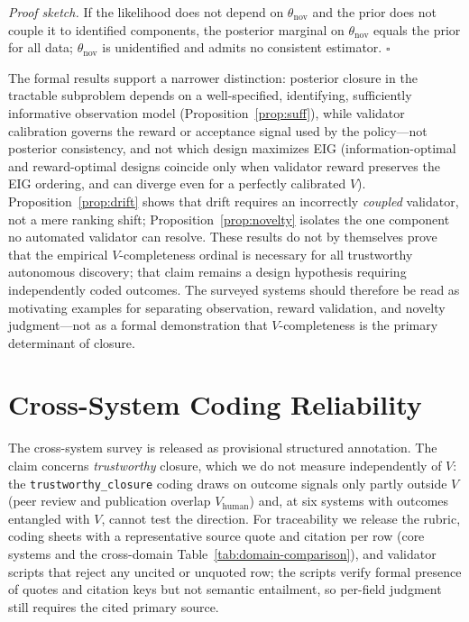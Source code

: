 \documentclass{article}
\begin{document}
\noindent\emph{Proof sketch.} If the likelihood does not depend on $\theta_{\mathrm{nov}}$ and the prior does not couple it to identified components, the posterior marginal on $\theta_{\mathrm{nov}}$ equals the prior for all data; $\theta_{\mathrm{nov}}$ is unidentified and admits no consistent estimator. $\square$

The formal results support a narrower distinction: posterior closure in the tractable subproblem depends on a well-specified, identifying, sufficiently informative observation model (Proposition~\ref{prop:suff}), while validator calibration governs the reward or acceptance signal used by the policy---not posterior consistency, and not which design maximizes EIG (information-optimal and reward-optimal designs coincide only when validator reward preserves the EIG ordering, and can diverge even for a perfectly calibrated $V$). Proposition~\ref{prop:drift} shows that drift requires an incorrectly \emph{coupled} validator, not a mere ranking shift; Proposition~\ref{prop:novelty} isolates the one component no automated validator can resolve. These results do not by themselves prove that the empirical $V$-completeness ordinal is necessary for all trustworthy autonomous discovery; that claim remains a design hypothesis requiring independently coded outcomes. The surveyed systems should therefore be read as motivating examples for separating observation, reward validation, and novelty judgment---not as a formal demonstration that $V$-completeness is the primary determinant of closure.

\section{Cross-System Coding Reliability}
\label{app:coding}

The cross-system survey is released as provisional structured annotation. The claim concerns \emph{trustworthy} closure, which we do not measure independently of $V$: the \texttt{trustworthy\_closure} coding draws on outcome signals only partly outside $V$ (peer review and publication overlap $V_\text{human}$) and, at six systems with outcomes entangled with $V$, cannot test the direction. For traceability we release the rubric, coding sheets with a representative source quote and citation per row (core systems and the cross-domain Table~\ref{tab:domain-comparison}), and validator scripts that reject any uncited or unquoted row; the scripts verify formal presence of quotes and citation keys but not semantic entailment, so per-field judgment still requires the cited primary source.
\end{document}
